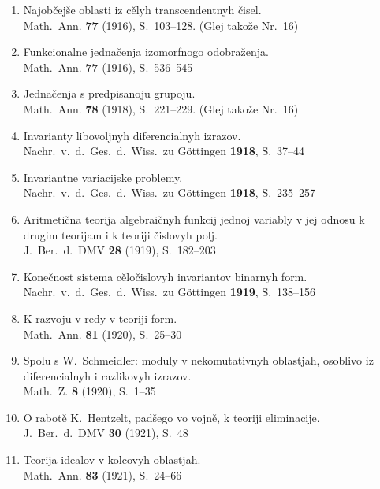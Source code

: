 \documentclass[11pt]{article}
\newcommand{\foreign}[1]{#1}
\begin{document}
\begin{enumerate}[label={\small\arabic*.},leftmargin=2em,itemsep=0.3em]
\item Najobčejše oblasti iz cělyh transcendentnyh čisel.\\
\foreign{Math.\ Ann.} \textbf{77} (1916), S.~103--128. (Glej takože Nr.~16)

\item Funkcionalne jednačenja izomorfnogo odobraženja.\\
\foreign{Math.\ Ann.} \textbf{77} (1916), S.~536--545

\item Jednačenja s predpisanoju grupoju.\\
\foreign{Math.\ Ann.} \textbf{78} (1918), S.~221--229. (Glej takože Nr.~16)

\item Invarianty libovoljnyh diferencialnyh izrazov.\\
\foreign{Nachr.\ v.\ d.\ Ges.\ d.\ Wiss.\ zu Göttingen} \textbf{1918}, S.~37--44

\item Invariantne variacijske problemy.\\
\foreign{Nachr.\ v.\ d.\ Ges.\ d.\ Wiss.\ zu Göttingen} \textbf{1918}, S.~235--257

\item Aritmetična teorija algebraičnyh funkcij jednoj variably v jej odnosu k drugim teorijam i k teoriji čislovyh polj.\\
\foreign{J.\ Ber.\ d.\ DMV} \textbf{28} (1919), S.~182--203

\item Konečnost sistema cěločislovyh invariantov binarnyh form.\\
\foreign{Nachr.\ v.\ d.\ Ges.\ d.\ Wiss.\ zu Göttingen} \textbf{1919}, S.~138--156

\item K razvoju v redy v teoriji form.\\
\foreign{Math.\ Ann.} \textbf{81} (1920), S.~25--30

\item Spolu s \foreign{W.\ Schmeidler}: moduly v nekomutativnyh oblastjah, osoblivo iz diferencialnyh i razlikovyh izrazov.\\
\foreign{Math.\ Z.} \textbf{8} (1920), S.~1--35

\item O rabotě K.\ Hentzelt, padšego vo vojně, k teoriji eliminacije.\\
\foreign{J.\ Ber.\ d.\ DMV} \textbf{30} (1921), S.~48

\item Teorija idealov v kolcovyh oblastjah.\\
\foreign{Math.\ Ann.} \textbf{83} (1921), S.~24--66


\end{enumerate}
\end{document}

